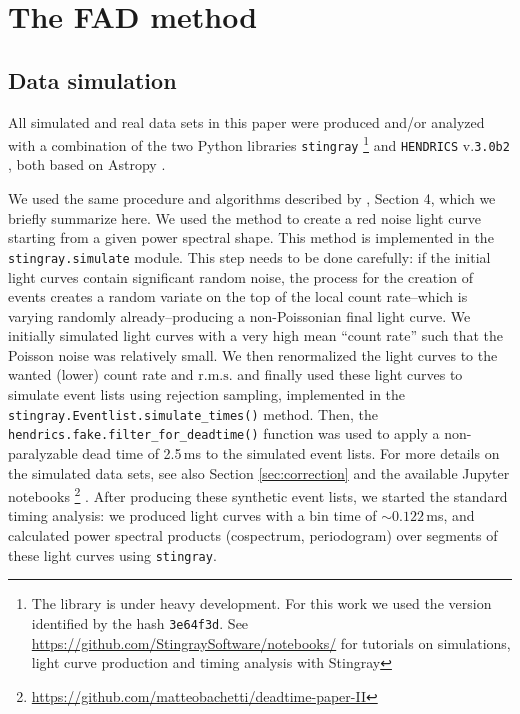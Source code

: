 \documentclass[twocolumn]{aastex61}
\newcommand{\rms}{\ensuremath{\mathrm{r.m.s.}}\xspace}
\begin{document}
\section{The FAD method} \label{sec:fadsec}
\subsection{Data simulation} \label{sec:data}
All simulated and real data sets in this paper were produced and/or analyzed with a combination of the two Python libraries \texttt{stingray}%
\footnote{The library is under heavy development.
    For this work we used the version identified by the hash \texttt{3e64f3d}.
    See \href{https://github.com/StingraySoftware/notebooks/}{https://github.com/StingraySoftware/notebooks/} for tutorials on simulations, light curve production and timing analysis with Stingray}
\citep{huppenkothen2016} and \texttt{HENDRICS} v.\texttt{3.0b2} \citep[formerly known as MaLTPyNT;][]{2015ascl.soft02021B}, both based on Astropy \citep{astropy2013}.

We used the same procedure and algorithms described by \citet{Bachetti+15}, Section 4, which we briefly summarize here.
We used the \citet{timmer1995} method to create a red noise light curve starting from a given power spectral shape. 
This method is implemented in the \texttt{stingray.simulate} module.
This step needs to be done carefully: if the initial light curves contain significant random noise, the process for the creation of events creates a random variate on the top of the local count rate--which is varying randomly already--producing a non-Poissonian final light curve. 
We initially simulated light curves with a very high mean ``count rate'' such that the Poisson noise was relatively small. We then renormalized the light curves to the wanted (lower) count rate and \rms and finally used these light curves to simulate event lists using rejection sampling, implemented in the \texttt{stingray.Eventlist.simulate\_times()} method.
Then, the \texttt{hendrics.fake.filter\_for\_deadtime()} function was used to apply a non-paralyzable dead time of 2.5\,ms to the simulated event lists. For more details on the simulated data sets, see also Section \ref{sec:correction} and the available Jupyter notebooks%
\footnote{\href{https://github.com/matteobachetti/deadtime-paper-II}{https://github.com/matteobachetti/deadtime-paper-II}} \citep[for a description of Jupyter notebooks, see][]{kluyver2016jupyter}.
After producing these synthetic event lists, we started the standard timing analysis: we produced light curves with a bin time of $\sim0.122$\,ms, and calculated power spectral products (cospectrum, periodogram) over segments of these light curves using \texttt{stingray}.
\end{document}
